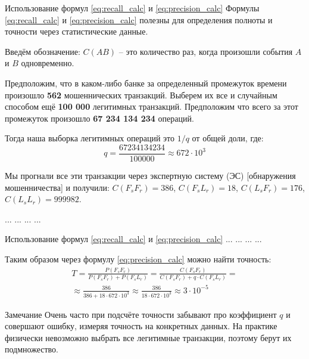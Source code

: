 \begin{frame}{Использование формул \eqref{eq:recall_calc} и \eqref{eq:precision_calc}}\label{frame:precision_calc_example}
	\footnotesize
	Формулы \eqref{eq:recall_calc} и \eqref{eq:precision_calc} полезны 
	для определения полноты и точности через статистические данные.
	
	Введём обозначение: $C(AB)$ -- это количество раз, когда произошли события $A$ и $B$ одновременно.
	
	Предположим, что в каком-либо банке за определенный промежуток времени
	произошло \textbf{562} мошеннических транзакций. 
	Выберем их все и случайным способом ещё \textbf{100 000} легитимных транзакций.
	Предположим что всего за этот промежуток произошло \textbf{67 234 134 234} операций. 
	
	Тогда наша выборка легитимных операций это $1/q$ от общей доли, где: 
	\begin{equation*}
	q = \frac{67234134234}{100000} \approx 672 \cdot 10^3
	\end{equation*}
	
	Мы прогнали все эти транзакции через экспертную систему (ЭС) [обнаружения мошенничества] и получили:
	$C(F_s F_r)= 386$, 
	$C(F_s L_r)= 18$, 
	$C(L_s F_r)= 176$, 
	$C(L_s L_r)= 999 982$.
	
	... ... ... ...
\end{frame}

\begin{frame}{Использование формул \eqref{eq:recall_calc} и \eqref{eq:precision_calc}} 
	... ... ... ...
	
	Таким образом через формулу  \eqref{eq:precision_calc} можно найти точность:
	\begin{eqnarray*}
		T = \frac{P(F_s F_r)}{P(F_s F_r) + P(F_s L_r )} = 
		\frac{C(F_s F_r)}{C(F_s F_r) + q \cdot C(F_s L_r)}  = \\
		\approx \frac{386}{386 + 18 \cdot  672 \cdot 10^3 }
		\approx \frac{386}{18 \cdot  672 \cdot 10^3 }
		\approx 3 \cdot 10^{-5}
	\end{eqnarray*}
	
	\begin{block}{Замечание}
		Очень часто при подсчёте точности забывают про коэффициент $q$ 
		и совершают ошибку, измеряя точность на конкретных данных.
		На практике физически невозможно выбрать все легитимные транзакции,
		поэтому берут их подмножество.
	\end{block}
	
\end{frame}

